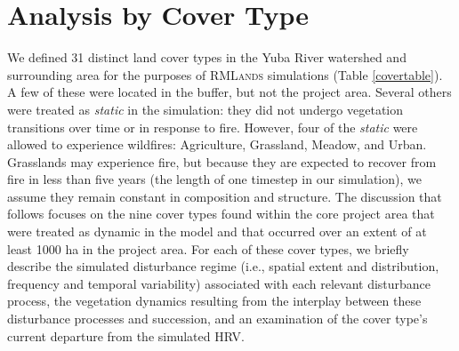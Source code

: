 \section{Analysis by Cover Type}
We defined 31 distinct land cover types in the Yuba River watershed and surrounding area for the purposes of \textsc{RMLands} simulations (Table \ref{covertable}). A few of these were located in the buffer, but not the project area. Several others were treated as \emph{static} in the simulation: they did not undergo vegetation transitions over time or in response to fire. However, four of the \emph{static} were allowed to experience wildfires: Agriculture, Grassland, Meadow, and Urban. Grasslands may experience fire, but because they are expected to recover from fire in less than five years (the length of one timestep in our simulation), we assume they remain constant in composition and structure. The discussion that follows focuses on the nine cover types found within the core project area that were treated as dynamic in the model and that occurred over an extent of at least 1000 ha in the project area. For each of these cover types, we briefly describe the simulated disturbance regime (i.e., spatial extent and distribution, frequency and temporal variability) associated with each relevant disturbance process, the vegetation dynamics resulting from the interplay between these disturbance processes and succession, and an examination of the cover type’s current departure from the simulated HRV. 




